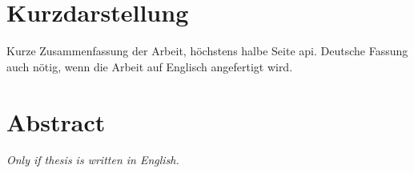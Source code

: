 \thispagestyle{empty}
\section*{Kurzdarstellung}
\label{sec:kurzdarstellung}
Kurze Zusammenfassung der Arbeit, höchstens halbe Seite \gls{api}.
Deutsche Fassung auch nötig, wenn die Arbeit auf Englisch angefertigt wird.

\blindtext


\section*{Abstract}
\label{sec:abstract}
\emph{Only if thesis is written in English.}

\blindtext
